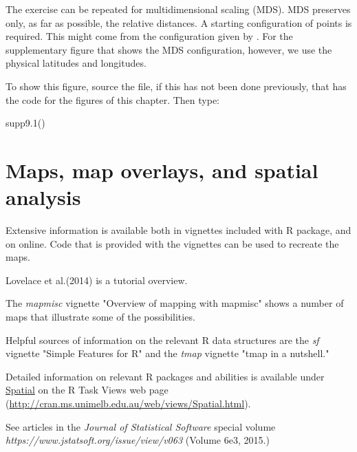 The exercise can be repeated for multidimensional scaling (MDS). MDS
preserves only, as far as possible, the relative distances.  A
starting configuration of points is required.  This might come from
the configuration given by .  For the supplementary
figure  that shows the MDS configuration, however, we
use the physical latitudes and longitudes.

To show this figure, source the file, if this has not been done
previously, that has the code for the figures of this chapter. Then
type:
\begin{Schunk}
\begin{Sinput}
supp9.1()
\end{Sinput}
\end{Schunk}

\section{Maps, map overlays, and spatial analysis}

Extensive information is available both in vignettes included
with R package, and on online.  Code that is provided with
the vignettes can be used to recreate the maps.

\begin{itemizz}
\item[] Lovelace et al.(2014) is a tutorial overview.
\item[] The {\em mapmisc} vignette "Overview of mapping with mapmisc"
shows a number of maps that illustrate some of the possibilities.
\item[] Helpful sources of information on the relevant R data structures
are the {\em sf} vignette "Simple Features for R" and the {\em tmap} 
vignette "tmap in a nutshell."
\item[] Detailed information on relevant R packages and abilities
is available under \underline{Spatial} on the R Task Views web page
  (\url{http://cran.ms.unimelb.edu.au/web/views/Spatial.html}).
  \item[] See articles in the {\em Journal of Statistical Software}
  special volume {\em https://www.jstatsoft.org/issue/view/v063}
  (Volume 6e3, 2015.)
\end{itemizz}

